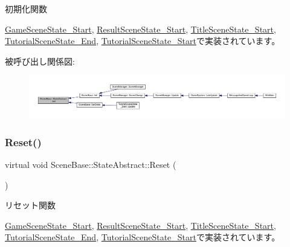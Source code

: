 初期化関数 



\mbox{\hyperlink{class_game_scene_state___start_ae921c57f349fbb2f00a197d40a3404b7}{Game\+Scene\+State\+\_\+\+Start}}, \mbox{\hyperlink{class_result_scene_state___start_a615c7e05efd2320b8956c5fd94398f55}{Result\+Scene\+State\+\_\+\+Start}}, \mbox{\hyperlink{class_title_scene_state___start_a3e785ba088ac3fd0989fd657e5d0cd34}{Title\+Scene\+State\+\_\+\+Start}}, \mbox{\hyperlink{class_tutorial_scene_state___end_a572e5687140ff5ac43789f90462c05a5}{Tutorial\+Scene\+State\+\_\+\+End}}, \mbox{\hyperlink{class_tutorial_scene_state___start_acd4cd7e4efeebffa9616d7ca31c7b1c0}{Tutorial\+Scene\+State\+\_\+\+Start}}で実装されています。

被呼び出し関係図\+:\nopagebreak
\begin{figure}[H]
\begin{center}
\leavevmode
\includegraphics[width=350pt]{class_scene_base_1_1_state_abstract_a2f5ea12e789aa52df179e6df469b870d_icgraph}
\end{center}
\end{figure}
\mbox{\label{class_scene_base_1_1_state_abstract_a7e00d36fa023d91a0f205f12662584a0}} 
\subsubsection{\texorpdfstring{Reset()}{Reset()}}
{\footnotesize\ttfamily virtual void Scene\+Base\+::\+State\+Abstract\+::\+Reset (\begin{DoxyParamCaption}{ }\end{DoxyParamCaption})\hspace{0.3cm}{\ttfamily [pure virtual]}}



リセット関数 



\mbox{\hyperlink{class_game_scene_state___start_a59270f7b65613f580864ed8ea3056179}{Game\+Scene\+State\+\_\+\+Start}}, \mbox{\hyperlink{class_result_scene_state___start_a8f776a7b2d31451c434fb74ffdd65960}{Result\+Scene\+State\+\_\+\+Start}}, \mbox{\hyperlink{class_title_scene_state___start_af4dfe902a4391ca8f0cff5d1aa9507f8}{Title\+Scene\+State\+\_\+\+Start}}, \mbox{\hyperlink{class_tutorial_scene_state___end_ada1a87235a021b40f8eca96e31879227}{Tutorial\+Scene\+State\+\_\+\+End}}, \mbox{\hyperlink{class_tutorial_scene_state___start_a40bfdf7acd93b619138bf708adff31e4}{Tutorial\+Scene\+State\+\_\+\+Start}}で実装されています。

